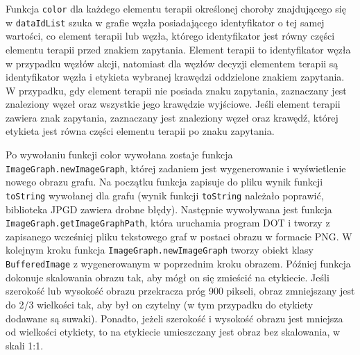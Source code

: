 Funkcja \texttt{color} dla każdego elementu terapii określonej choroby znajdującego się w \texttt{dataIdList} szuka w grafie węzła posiadającego identyfikator o tej samej wartości, co element terapii lub węzła, którego identyfikator jest równy części elementu terapii przed znakiem zapytania. Element terapii to identyfikator węzła w przypadku węzłów akcji, natomiast dla węzłów decyzji elementem terapii są identyfikator węzła i etykieta wybranej krawędzi oddzielone znakiem zapytania.
W przypadku, gdy element terapii nie posiada znaku zapytania, zaznaczany jest znaleziony węzeł oraz wszystkie jego krawędzie wyjściowe.  Jeśli element terapii zawiera znak zapytania, zaznaczany jest znaleziony węzeł oraz krawędź, której etykieta jest równa części elementu terapii po znaku zapytania.
 
Po wywołaniu funkcji color wywołana zostaje funkcja \texttt{ImageGraph.newImageGraph}, której zadaniem jest wygenerowanie i wyświetlenie nowego obrazu grafu. Na początku funkcja zapisuje do pliku wynik funkcji \texttt{toString} wywołanej dla grafu (wynik funkcji \texttt{toString} należało poprawić, biblioteka JPGD zawiera drobne błędy). Następnie wywoływana jest funkcja \texttt{ImageGraph.getImage\-GraphPath}, która uruchamia program DOT i tworzy z zapisanego wcześniej pliku tekstowego graf w postaci obrazu w formacie PNG. W kolejnym kroku funkcja \texttt{ImageGraph.newImageGraph} tworzy obiekt klasy \texttt{BufferedImage} z wygenerowanym w poprzednim kroku obrazem. Później funkcja dokonuje skalowania obrazu tak, aby mógł on się zmieścić na etykiecie. 
Jeśli szerokość lub wysokość obrazu przekracza próg 900 pikseli, obraz zmniejszany jest do 2/3 wielkości tak, aby był on czytelny (w tym przypadku do etykiety dodawane są suwaki). Ponadto, jeżeli szerokość i wysokość obrazu jest mniejsza od wielkości etykiety, to na etykiecie umieszczany jest obraz bez skalowania, w skali 1:1.
 
